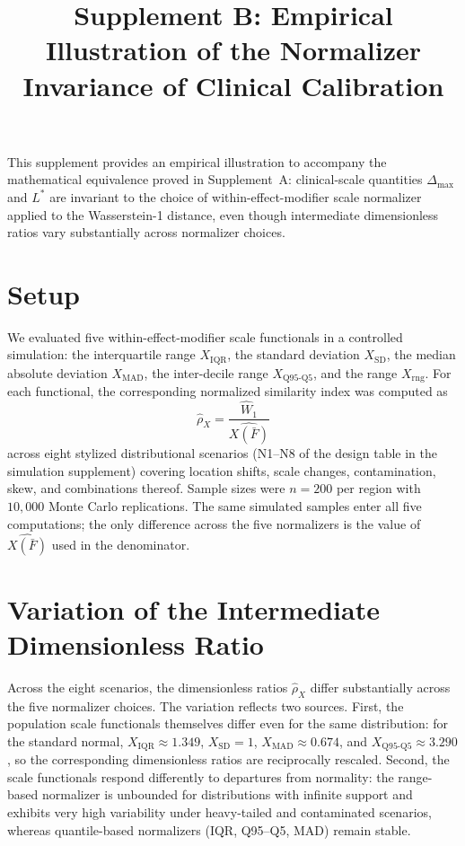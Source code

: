 \documentclass[11pt]{article}
\title{Supplement B: Empirical Illustration of the Normalizer Invariance of Clinical Calibration}
\date{}
\begin{document}
\maketitle

This supplement provides an empirical illustration to accompany the mathematical equivalence proved in Supplement~A: clinical-scale quantities $\Delta_{\max}$ and $L^*$ are invariant to the choice of within-effect-modifier scale normalizer applied to the Wasserstein-1 distance, even though intermediate dimensionless ratios vary substantially across normalizer choices.

\section{Setup}\label{sec:supB_setup}

We evaluated five within-effect-modifier scale functionals in a controlled simulation: the interquartile range $X_{\text{IQR}}$, the standard deviation $X_{\text{SD}}$, the median absolute deviation $X_{\text{MAD}}$, the inter-decile range $X_{\text{Q95-Q5}}$, and the range $X_{\text{rng}}$. For each functional, the corresponding normalized similarity index was computed as
\[
\hat{\rho}_X = \frac{\widehat{W}_1}{\widehat{X(\bar{F})}}
\]
across eight stylized distributional scenarios (N1--N8 of the design table in the simulation supplement) covering location shifts, scale changes, contamination, skew, and combinations thereof. Sample sizes were $n = 200$ per region with $10{,}000$ Monte Carlo replications. The same simulated samples enter all five computations; the only difference across the five normalizers is the value of $\widehat{X(\bar{F})}$ used in the denominator.

\section{Variation of the Intermediate Dimensionless Ratio}\label{sec:supB_variation}

Across the eight scenarios, the dimensionless ratios $\hat{\rho}_X$ differ substantially across the five normalizer choices. The variation reflects two sources. First, the population scale functionals themselves differ even for the same distribution: for the standard normal, $X_{\text{IQR}} \approx 1.349$, $X_{\text{SD}} = 1$, $X_{\text{MAD}} \approx 0.674$, and $X_{\text{Q95-Q5}} \approx 3.290$, so the corresponding dimensionless ratios are reciprocally rescaled. Second, the scale functionals respond differently to departures from normality: the range-based normalizer is unbounded for distributions with infinite support and exhibits very high variability under heavy-tailed and contaminated scenarios, whereas quantile-based normalizers (IQR, Q95--Q5, MAD) remain stable.
\end{document}
